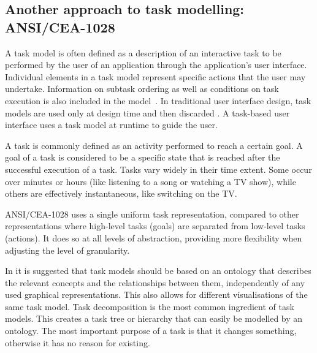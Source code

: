 	
\subsection{Another approach to task modelling: ANSI/CEA-1028}
\label{cea2018}

	A task model is often defined as a description of an interactive task to be performed by the user of an application through the application's user interface. Individual elements in a task model represent specific actions that the user may undertake. Information on subtask ordering as well as conditions on task execution is also included in the model~\cite{Limbourg2004}. In traditional user interface design, task models are used only at design time and then discarded \cite{Rich2009}. A task-based user interface uses a task model at runtime to guide the user.

	A task is commonly defined as an activity performed to reach a certain goal. A goal of a task is considered to be a specific state that is reached after the successful execution of a task. Tasks vary widely in their time extent. Some occur over minutes or hours (like listening to a song or watching a TV show), while others are effectively instantaneous, like switching on the TV.

	ANSI/CEA-1028 \cite{Rich2009} uses a single uniform task representation, compared to other representations where high-level tasks (goals) are separated from low-level tasks (actions). It does so at all levels of abstraction, providing more flexibility when adjusting the level of granularity. %

	In \cite{VanWelie1998} it is suggested that task models should be based on an ontology that describes the relevant concepts and the relationships between them, independently of any used graphical representations. This also allows for different visualisations of the same task model. Task decomposition is the most common ingredient of task models. This creates a task tree or hierarchy that can easily be modelled by an ontology. The most important purpose of a task is that it changes something, otherwise it has no reason for existing.

	
